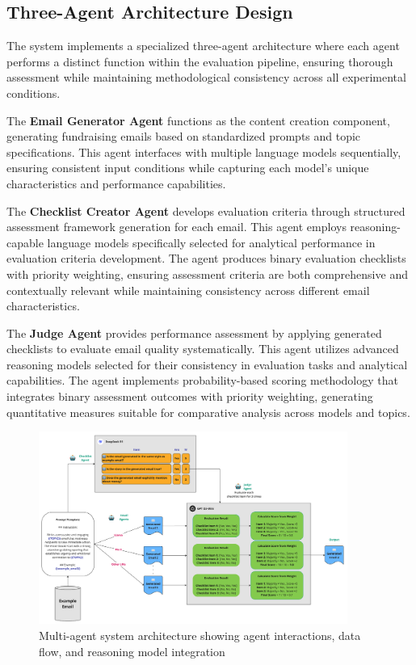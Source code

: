 \subsection{Three-Agent Architecture Design}

The system implements a specialized three-agent architecture where each agent performs a distinct function within the evaluation pipeline, ensuring thorough assessment while maintaining methodological consistency across all experimental conditions.

The \textbf{Email Generator Agent} functions as the content creation component, generating fundraising emails based on standardized prompts and topic specifications. This agent interfaces with multiple language models sequentially, ensuring consistent input conditions while capturing each model's unique characteristics and performance capabilities.

The \textbf{Checklist Creator Agent} develops evaluation criteria through structured assessment framework generation for each email. This agent employs reasoning-capable language models specifically selected for analytical performance in evaluation criteria development. The agent produces binary evaluation checklists with priority weighting, ensuring assessment criteria are both comprehensive and contextually relevant while maintaining consistency across different email characteristics.

The \textbf{Judge Agent} provides performance assessment by applying generated checklists to evaluate email quality systematically. This agent utilizes advanced reasoning models selected for their consistency in evaluation tasks and analytical capabilities. The agent implements probability-based scoring methodology that integrates binary assessment outcomes with priority weighting, generating quantitative measures suitable for comparative analysis across models and topics.

\begin{figure}[htbp]
    \centering
    \includegraphics[width=0.9\textwidth]{figures/agent-diagram.png}
    \caption{Multi-agent system architecture showing agent interactions, data flow, and reasoning model integration}
    \label{fig:system-architecture}
\end{figure}

